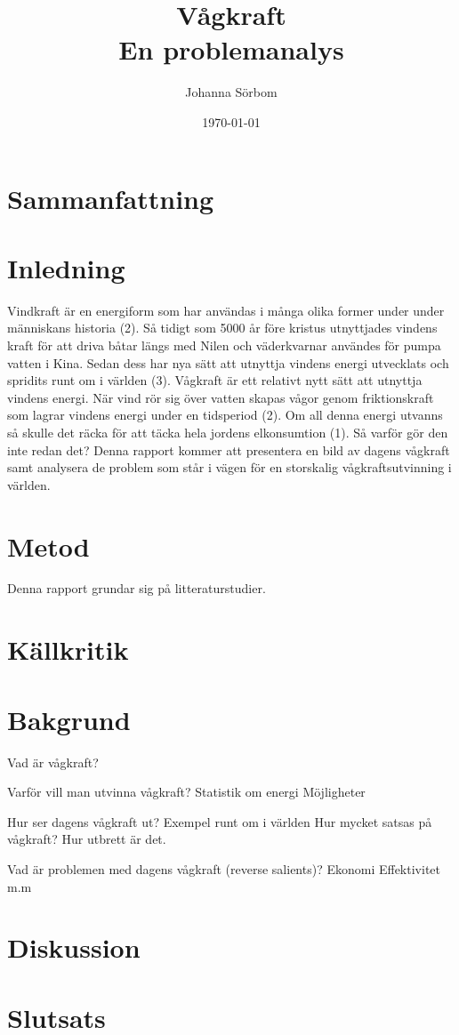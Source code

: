 \documentclass[10pt,a4paper,oneside]{article}
\title{Vågkraft \\ 
\large En problemanalys}
\author{\small Johanna Sörbom}
\date{\small \today}
\begin{document}
\maketitle
\newpage

\section{Sammanfattning}
\newpage

\tableofcontents
\newpage

\section{Inledning}
Vindkraft är en energiform som har användas i många olika former under under människans historia (2). Så tidigt som 5000 år före kristus utnyttjades vindens kraft för att driva båtar längs med Nilen och väderkvarnar användes för pumpa vatten i Kina. Sedan dess har nya sätt att utnyttja vindens energi utvecklats och spridits runt om i världen (3). Vågkraft är ett relativt nytt sätt att utnyttja vindens energi. När vind rör sig över vatten skapas vågor genom friktionskraft som lagrar vindens energi under en tidsperiod (2). Om all denna energi utvanns så skulle det räcka för att täcka hela jordens elkonsumtion (1). Så varför gör den inte redan det? Denna rapport kommer att presentera en bild av dagens vågkraft samt analysera de problem som står i vägen för en storskalig vågkraftsutvinning i världen. 
\newpage

\section{Metod}
Denna rapport grundar sig på litteraturstudier. 

\section{Källkritik}

\section{Bakgrund}
Vad är vågkraft? 

Varför vill man utvinna vågkraft?
Statistik om energi 
Möjligheter 

Hur ser dagens vågkraft ut?
Exempel runt om i världen
Hur mycket satsas på vågkraft?
Hur utbrett är det.

Vad är problemen med dagens vågkraft (reverse salients)?
Ekonomi
Effektivitet 
m.m 

\section{Diskussion}

\section{Slutsats}
\end{document}
